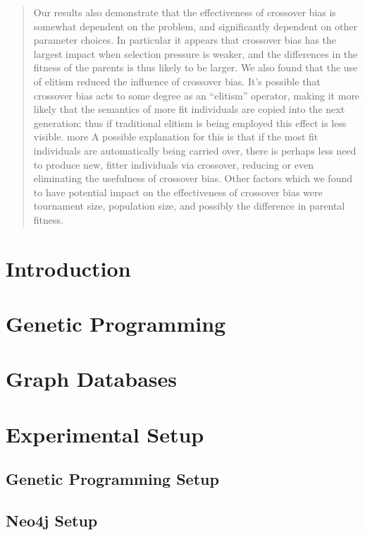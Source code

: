 \documentclass[12pt]{article}
\begin{document}
\begin{abstract}
Our results also demonstrate that the effectiveness of 
crossover bias is somewhat dependent on the problem, and significantly dependent on other parameter choices. In 
particular it appears that crossover bias has the largest impact when selection pressure is weaker, and the differences 
in the fitness of the parents is thus likely to be larger. We also found that the use of elitism 
reduced the influence of crossover bias. It's possible that crossover bias acts to some degree as an 
``elitism'' operator, making it more likely that the semantics of more fit individuals are copied into the next generation; 
thus if traditional elitism is being employed this effect is less visible. more A possible explanation for this is 
that if the most fit individuals are automatically being carried over, there is perhaps less need to produce new, 
fitter individuals via crossover, reducing or even eliminating the usefulness of crossover bias. Other factors 
which we found to have potential impact on the effectiveness of crossover bias were tournament size, 
population size, and possibly the difference in parental fitness.

\end{abstract}

\section{Introduction} \label{Introduction}

\section{Genetic Programming} \label{Genetic Programming}

\section{Graph Databases} \label{Graph Databases}

\section{Experimental Setup} \label{Experiments}

\subsection{Genetic Programming Setup} \label{Genetic Programming Setup}

\subsection{Neo4j Setup} \label{Neo4j Setup}
\end{document}
